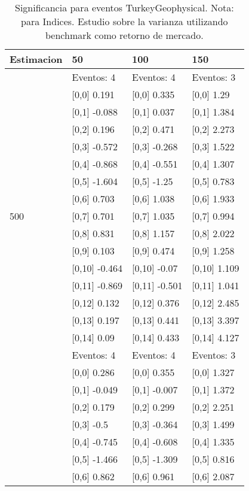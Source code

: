 \begin{table}

\caption{Significancia para eventos TurkeyGeophysical. Nota: para Indices. Estudio sobre la varianza utilizando benchmark como retorno de mercado.}
\centering
\begin{tabular}[t]{llll}
\toprule
Estimacion & 50 & 100 & 150\\
\midrule
 & Eventos:  4 & Eventos:  4 & Eventos:  3\\
 & {}[0,0] 0.191 & {}[0,0] 0.335 & {}[0,0] 1.29\\
 & {}[0,1] -0.088 & {}[0,1] 0.037 & {}[0,1] 1.384\\
 & {}[0,2] 0.196 & {}[0,2] 0.471 & {}[0,2] 2.273\\
 & {}[0,3] -0.572 & {}[0,3] -0.268 & {}[0,3] 1.522\\
\addlinespace
 & {}[0,4] -0.868 & {}[0,4] -0.551 & {}[0,4] 1.307\\
 & {}[0,5] -1.604 & {}[0,5] -1.25 & {}[0,5] 0.783\\
 & {}[0,6] 0.703 & {}[0,6] 1.038 & {}[0,6] 1.933\\
500 & {}[0,7] 0.701 & {}[0,7] 1.035 & {}[0,7] 0.994\\
 & {}[0,8] 0.831 & {}[0,8] 1.157 & {}[0,8] 2.022\\
\addlinespace
 & {}[0,9] 0.103 & {}[0,9] 0.474 & {}[0,9] 1.258\\
 & {}[0,10] -0.464 & {}[0,10] -0.07 & {}[0,10] 1.109\\
 & {}[0,11] -0.869 & {}[0,11] -0.501 & {}[0,11] 1.041\\
 & {}[0,12] 0.132 & {}[0,12] 0.376 & {}[0,12] 2.485\\
 & {}[0,13] 0.197 & {}[0,13] 0.441 & {}[0,13] 3.397\\
\addlinespace
 & {}[0,14] 0.09 & {}[0,14] 0.433 & {}[0,14] 4.127\\
 & Eventos:  4 & Eventos:  4 & Eventos:  3\\
 & {}[0,0] 0.286 & {}[0,0] 0.355 & {}[0,0] 1.327\\
 & {}[0,1] -0.049 & {}[0,1] -0.007 & {}[0,1] 1.372\\
 & {}[0,2] 0.179 & {}[0,2] 0.299 & {}[0,2] 2.251\\
\addlinespace
 & {}[0,3] -0.5 & {}[0,3] -0.364 & {}[0,3] 1.499\\
 & {}[0,4] -0.745 & {}[0,4] -0.608 & {}[0,4] 1.335\\
 & {}[0,5] -1.466 & {}[0,5] -1.309 & {}[0,5] 0.816\\
 & {}[0,6] 0.862 & {}[0,6] 0.961 & {}[0,6] 2.087\\

\end{tabular}
\end{table}
